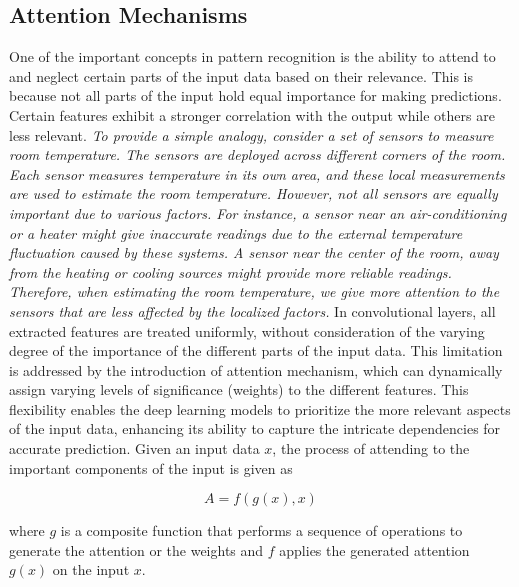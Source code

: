 \documentclass[preprint,12pt]{elsarticle}
\begin{document}
\subsection{Attention Mechanisms}
One of the important concepts in pattern recognition is the ability to attend to and neglect certain parts of the input data based on their relevance. This is because not all parts of the input hold equal importance for making predictions. Certain features exhibit a stronger correlation with the output while others are less relevant. \emph{To provide a simple analogy, consider a set of sensors to measure room temperature. The sensors are deployed across different corners of the room. Each sensor measures temperature in its own area, and these local measurements are used to estimate the room temperature. However, not all sensors are equally important due to various factors. For instance, a sensor near an air-conditioning or a heater might give inaccurate readings due to the external temperature fluctuation caused by these systems. A sensor near the center of the room, away from the heating or cooling sources might provide more reliable readings. Therefore, when estimating the room temperature, we give more attention to the sensors that are less affected by the localized factors.} In convolutional layers, all extracted features are treated uniformly, without consideration of the varying degree of the importance of the different parts of the input data. This limitation is addressed by the introduction of attention mechanism, which can dynamically assign varying levels of significance (weights) to the different features. This flexibility enables the deep learning models to prioritize the more relevant aspects of the input data, enhancing its ability to capture the intricate dependencies for accurate prediction. Given an input data $x$, the process of attending to the important components of the input is given as

\begin{equation}
A=f(g(x),x)
\end{equation}

\noindent where $g$ is a composite function that performs a sequence of operations to generate the attention or the weights and $f$ applies the generated attention $g(x)$ on the input $x$. 
\end{document}

